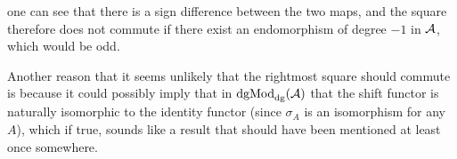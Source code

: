 \documentclass[a4paper, 12pt]{article}
\begin{document}
\begin{center}
\end{center}
one can see that there is a sign difference between the two maps, and the square therefore does not commute if there exist an endomorphism of degree \( -1 \) in \( {\mathcal{A}} \), which would be odd.

Another reason that it seems unlikely that the rightmost square should commute is because it could possibly imply that in \( \operatorname{dgMod}_{\operatorname{dg}}({\mathcal{A}}) \) that the shift functor is naturally isomorphic to the identity functor (since \( \sigma_A \) is an isomorphism for any \( A \)), which if true, sounds like a result that should have been mentioned at least once somewhere.

{}

\end{document}
